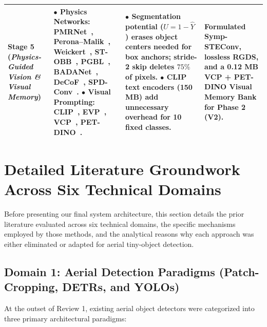 \documentclass[11pt,a4paper]{article}
\begin{document}
\begin{table}[H]
\begin{tabular}{p{2.2cm} p{3.8cm} p{4.6cm} p{3.8cm}}
\textbf{Stage 5} \newline (\emph{Physics-Guided Vision \& Visual Memory}) &
$\bullet$ Physics Networks: PMRNet~\cite{kang2026pmrnet}, Perona--Malik~\cite{perona1990anisotropic}, Weickert~\cite{weickert1999coherence}, ST-OBB~\cite{yang2024stobb}, PGBL~\cite{liao2026pgbl}, BADANet~\cite{shang2026badanet}, DeCoF~\cite{liu2025decof}, SPD-Conv~\cite{sunkara2022spd}. \newline
$\bullet$ Visual Prompting: CLIP~\cite{radford2021clip}, EVP~\cite{liu2023evp}, VCP~\cite{wang2025vcp}, PET-DINO~\cite{fu2026petdino}. &
$\bullet$ Segmentation potential ($U=1-\hat{Y}$) erases object centers needed for box anchors; stride-2 skip deletes $75\%$ of pixels. \newline
$\bullet$ CLIP text encoders (150 MB) add unnecessary overhead for 10 fixed classes. &
Formulated \textbf{Symp-STEConv}, lossless \textbf{RGDS}, and a 0.12 MB \textbf{VCP + PET-DINO Visual Memory Bank} for Phase 2 (V2). \\ \bottomrule
\end{tabular}
\end{table}

\section{Detailed Literature Groundwork Across Six Technical Domains}

Before presenting our final system architecture, this section details the prior literature evaluated across six technical domains, the specific mechanisms employed by those methods, and the analytical reasons why each approach was either eliminated or adapted for aerial tiny-object detection.

\subsection{Domain 1: Aerial Detection Paradigms (Patch-Cropping, DETRs, and YOLOs)}

At the outset of Review 1, existing aerial object detectors were categorized into three primary architectural paradigms:
\end{document}
